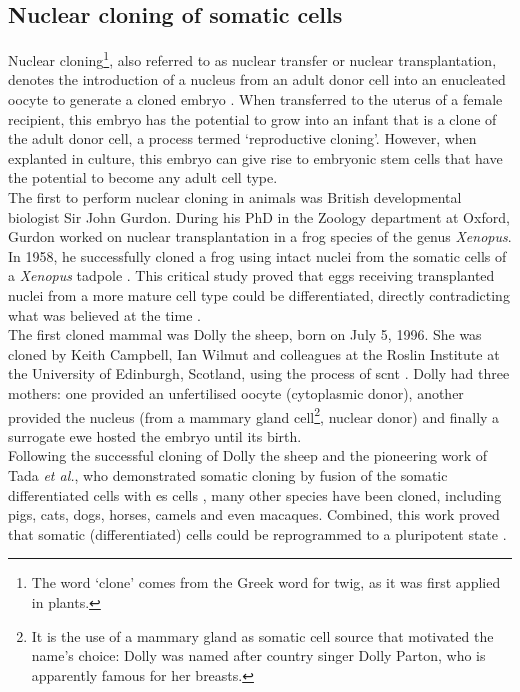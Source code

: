 \subsection{Nuclear cloning of somatic cells}
\label{sec:cloning} 

Nuclear cloning\footnote{The word `clone' comes from the Greek word for twig, as it was first applied in plants.}, also referred to as nuclear transfer or nuclear transplantation, denotes the introduction of a nucleus from an adult donor cell into an enucleated oocyte to generate a cloned embryo \cite{hochedlinger2003nuclear}.
When transferred to the uterus of a female recipient, this embryo has the potential to grow into an infant that is a clone of the adult donor cell, a process termed `reproductive cloning'. 
However, when explanted in culture, this embryo can give rise to embryonic stem cells that have the potential to become any adult cell type.\\

The first to perform nuclear cloning in animals was British developmental biologist Sir John Gurdon. 
During his PhD in the Zoology department at Oxford, Gurdon worked on nuclear transplantation in a frog species of the genus \textit{Xenopus}.
In 1958, he successfully cloned a frog using intact nuclei from the somatic cells of a \textit{Xenopus} tadpole \cite{gurdon1962developmental}.
This critical study proved that eggs receiving transplanted nuclei from a more mature cell type could be differentiated, directly contradicting what was believed at the time \cite{king1955changes}. \\

The first cloned mammal was Dolly the sheep, born on July 5, 1996.
She was cloned by Keith Campbell, Ian Wilmut and colleagues at the Roslin Institute at the University of Edinburgh, Scotland, using the process of \gls{scnt} \cite{wilmut1997viable}.
Dolly had three mothers: one provided an unfertilised oocyte (cytoplasmic donor), another provided the nucleus (from a mammary gland cell\footnote{It is the use of a mammary gland as somatic cell source that motivated the name's choice: Dolly was named after country singer Dolly Parton, who is apparently famous for her breasts.}, nuclear donor) and finally a surrogate ewe hosted the embryo until its birth.\\

Following the successful cloning of Dolly the sheep and the pioneering work of Tada \textit{et al.}, who demonstrated somatic cloning by fusion of the somatic differentiated cells with \gls{es} cells \cite{tada2001nuclear}, many other species have been cloned, including pigs, cats, dogs, horses, camels and even macaques.
Combined, this work proved that somatic (differentiated) cells could be reprogrammed to a pluripotent state \cite{cowan2005nuclear}.\\

